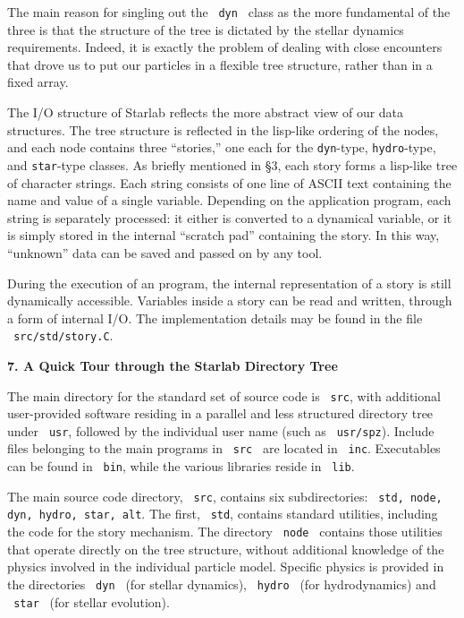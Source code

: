 The main reason for singling out the {\tt\ dyn\ } class as the more
fundamental of the three is that the structure of the tree is dictated
by the stellar dynamics requirements.  Indeed, it is exactly the
problem of dealing with close encounters that drove us to put our
particles in a flexible tree structure, rather than in a fixed array.

The I/O structure of Starlab reflects the more abstract view of our
data structures.  The tree structure is reflected in the lisp-like
ordering of the nodes, and each node contains three ``stories,'' one
each for the {\tt dyn}-type, {\tt hydro}-type, and {\tt star}-type
classes.  As briefly mentioned in \S3, each story forms a lisp-like
tree of character strings.  Each string consists of one line of ASCII
text containing the name and value of a single variable.  Depending on
the application program, each string is separately processed: it
either is converted to a dynamical variable, or it is simply stored in
the internal ``scratch pad'' containing the story. In this way,
``unknown'' data can be saved and passed on by any tool.

During the execution of an program, the internal representation of a
story is still dynamically accessible.  Variables inside a story can
be read and written, through a form of internal I/O.  The
implementation details may be found in the file {\tt\ src/std/story.C}.

\null\bigskip
\centerline{\bf 7. A Quick Tour through the Starlab Directory Tree}
\medskip

The main directory for the standard set of source code is {\tt\ src},
with additional user-provided software residing in a parallel and less
structured directory tree under {\tt\ usr}, followed by the individual
user name (such as {\tt\ usr/spz}).  Include files belonging to the
main programs in {\tt\ src\ } are located in {\tt\ inc}.
Executables can be found in {\tt\ bin}, while the various libraries
reside in {\tt\ lib}.

The main source code directory, {\tt\ src}, contains six
subdirectories: {\tt\ std, node, dyn, hydro, star, alt}.  The first,
{\tt\ std}, contains standard utilities, including the code for the
story mechanism.  The directory {\tt\ node\ } contains those utilities
that operate directly on the tree structure, without additional
knowledge of the physics involved in the individual particle model.
Specific physics is provided in the directories {\tt\ dyn\ } (for
stellar dynamics), {\tt\ hydro\ } (for hydrodynamics) and {\tt\ star\
} (for stellar evolution).

